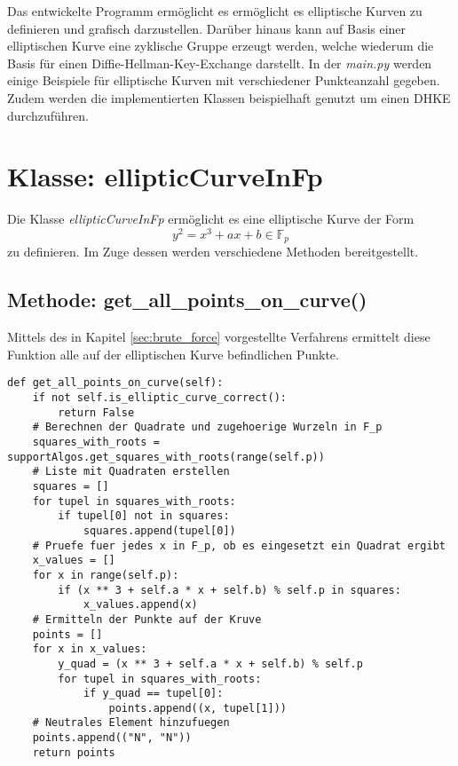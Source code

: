 Das entwickelte Programm ermöglicht es ermöglicht es elliptische Kurven zu definieren und grafisch darzustellen. Darüber hinaus kann auf Basis einer elliptischen Kurve eine zyklische Gruppe erzeugt werden, welche wiederum die Basis für einen Diffie-Hellman-Key-Exchange darstellt. In der \textit{main.py} werden einige Beispiele für elliptische Kurven mit verschiedener Punkteanzahl gegeben. Zudem werden die implementierten Klassen beispielhaft genutzt um einen DHKE durchzuführen.


\section{Klasse: ellipticCurveInFp}
Die Klasse \textit{ellipticCurveInFp} ermöglicht es eine elliptische Kurve der Form $$y^2 = x^3 + ax + b \in \mathbb{F}_p$$ zu definieren. Im Zuge dessen werden verschiedene Methoden bereitgestellt.

\subsection{Methode: get\_all\_points\_on\_curve()}
Mittels des in Kapitel \ref{sec:brute_force} vorgestellte Verfahrens ermittelt diese Funktion alle auf der elliptischen Kurve befindlichen Punkte.

\vspace{\baselineskip}
\begin{lstlisting}[caption={Methode: get\_all\_points\_on\_curve()}, captionpos=b]
def get_all_points_on_curve(self):
    if not self.is_elliptic_curve_correct():
        return False
    # Berechnen der Quadrate und zugehoerige Wurzeln in F_p
    squares_with_roots = supportAlgos.get_squares_with_roots(range(self.p))
    # Liste mit Quadraten erstellen
    squares = []
    for tupel in squares_with_roots:
        if tupel[0] not in squares:
            squares.append(tupel[0])
    # Pruefe fuer jedes x in F_p, ob es eingesetzt ein Quadrat ergibt
    x_values = []
    for x in range(self.p):
        if (x ** 3 + self.a * x + self.b) % self.p in squares:
            x_values.append(x)
    # Ermitteln der Punkte auf der Kruve
    points = []
    for x in x_values:
        y_quad = (x ** 3 + self.a * x + self.b) % self.p
        for tupel in squares_with_roots:
            if y_quad == tupel[0]:
                points.append((x, tupel[1]))
    # Neutrales Element hinzufuegen
    points.append(("N", "N"))
    return points
\end{lstlisting}
\vspace{\baselineskip}

